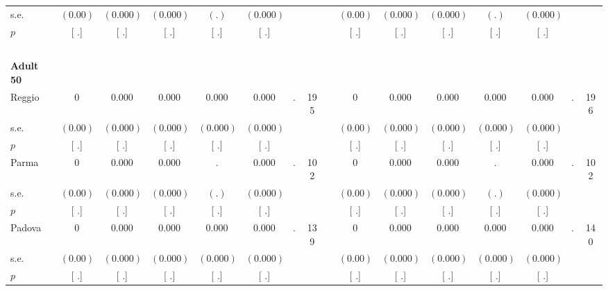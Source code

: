 \begin{longtable}{L{8em} c c c c c c c p{1em} c c c c c c c}
\quad \quad \quad \quad s.e.& $ (     0.00)$ & $ (    0.000)$ & $ (    0.000)$ & $ (        .)$ & $ (    0.000)$ & & & & $ (     0.00)$ & $ (    0.000)$ & $ (    0.000)$ & $ (        .)$ & $ (    0.000)$ & &  \\*
\quad \quad \quad \quad $ p$ & [        .] & [        .] & [        .] & [        .] & [        .] & & & & [        .] & [        .] & [        .] & [        .] & [        .] & &  \\[1em]
~\\[1em]
\quad \quad \textbf{Adult 50} & & & & & & & & & & & & & & & \\* 
\quad \quad \quad Reggio& 0 &     0.000 &     0.000 &     0.000 &     0.000 &         . &       195 & & 0 &     0.000 &     0.000 &     0.000 &     0.000 &         . &       196  \\*
\quad \quad \quad \quad s.e.& $ (     0.00)$ & $ (    0.000)$ & $ (    0.000)$ & $ (    0.000)$ & $ (    0.000)$ & & & & $ (     0.00)$ & $ (    0.000)$ & $ (    0.000)$ & $ (    0.000)$ & $ (    0.000)$ & &  \\*
\quad \quad \quad \quad $ p$ & [        .] & [        .] & [        .] & [        .] & [        .] & & & & [        .] & [        .] & [        .] & [        .] & [        .] & &  \\[1em]
\quad \quad \quad Parma& 0 &     0.000 &     0.000 &         . &     0.000 &         . &       102 & & 0 &     0.000 &     0.000 &         . &     0.000 &         . &       102  \\*
\quad \quad \quad \quad s.e.& $ (     0.00)$ & $ (    0.000)$ & $ (    0.000)$ & $ (        .)$ & $ (    0.000)$ & & & & $ (     0.00)$ & $ (    0.000)$ & $ (    0.000)$ & $ (        .)$ & $ (    0.000)$ & &  \\*
\quad \quad \quad \quad $ p$ & [        .] & [        .] & [        .] & [        .] & [        .] & & & & [        .] & [        .] & [        .] & [        .] & [        .] & &  \\[1em]
\quad \quad \quad Padova& 0 &     0.000 &     0.000 &     0.000 &     0.000 &         . &       139 & & 0 &     0.000 &     0.000 &     0.000 &     0.000 &         . &       140  \\*
\quad \quad \quad \quad s.e.& $ (     0.00)$ & $ (    0.000)$ & $ (    0.000)$ & $ (    0.000)$ & $ (    0.000)$ & & & & $ (     0.00)$ & $ (    0.000)$ & $ (    0.000)$ & $ (    0.000)$ & $ (    0.000)$ & &  \\*
\quad \quad \quad \quad $ p$ & [        .] & [        .] & [        .] & [        .] & [        .] & & & & [        .] & [        .] & [        .] & [        .] & [        .] & &  \\[1em]

\end{longtable}
